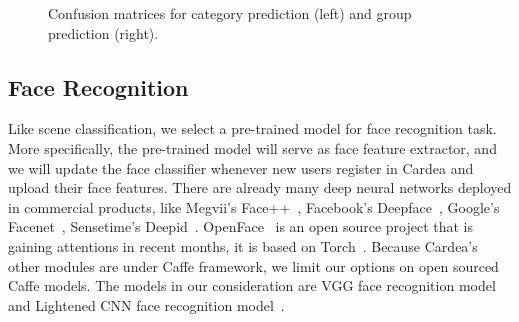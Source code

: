 \begin{figure}[!htbp]
    \caption{Confusion matrices for category prediction (left) and group prediction (right).}
    \label{fig:ch4-scnconfumat}
\end{figure}



\subsection{Face Recognition}
Like scene classification, we select a pre-trained model for face recognition task. More specifically, the pre-trained model will serve as face feature extractor, and we will update the face classifier whenever new users register in Cardea and upload their face features. There are already many deep neural networks deployed in commercial products, like Megvii's Face++~\cite{zhou2013extensive}, Facebook's Deepface~\cite{taigman2014deepface}, Google's Facenet~\cite{schroff2015facenet}, Sensetime's Deepid~\cite{sun2015deepid3}. OpenFace~\cite{amos2016openface} is an open source project that is gaining attentions in recent months, it is based on Torch~\cite{links:torch7}. Because Cardea's other modules are under Caffe framework, we limit our options on open sourced Caffe models. The models in our consideration are VGG face recognition model~\cite{parkhi2015deep} and Lightened CNN face recognition model~\cite{wu2015lightened}.

